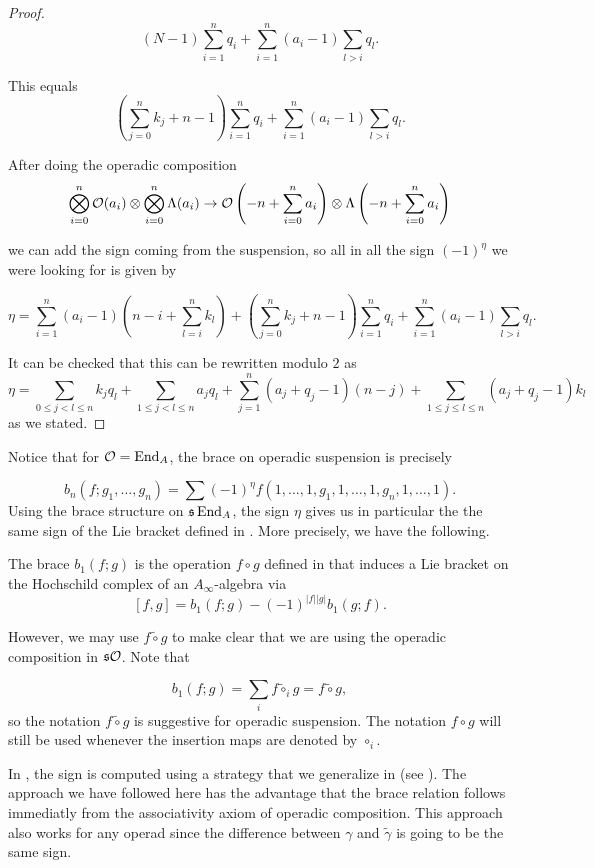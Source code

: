 \documentclass[Thesis.tex]{subfiles}
\begin{document}
\begin{proof}
\[(N-1)\sum_{i=1}^nq_i+\sum_{i=1}^n (a_i-1)\sum_{l>i}q_l.\]

This equals
\[\left(\sum_{j=0}^nk_j +n-1\right)\sum_{i=1}^nq_i+\sum_{i=1}^n (a_i-1)\sum_{l>i}q_l.\]

After doing the operadic composition 
\[\bigotimes_{i=0}^n {\mathcal O}(a_i)\otimes \bigotimes_{i=0}^n \Lambda(a_i)\to {\mathcal O}\left(-n+\sum_{i=0}^na_i\right)\otimes \Lambda\left(-n+\sum_{i=0}^na_i\right)\]

we can add the sign coming from the suspension, so all in all the sign $(-1)^\eta$ we were looking for is given by

\[\eta=\sum_{i=1}^n(a_i-1)(n-i+\sum_{l=i}^nk_l)+(\sum_{j=0}^nk_j +n-1)\sum_{i=1}^nq_i+\sum_{i=1}^n (a_i-1)\sum_{l>i}q_l.\]

It can be checked that this can be rewritten modulo $2$ as 
\[\eta=\sum_{0\leq j<l\leq n}k_jq_l+\sum_{1\leq j<l\leq n}a_jq_l+\sum_{j=1}^n (a_j+q_j-1)(n-j)+\sum_{1\leq j\leq l\leq n} (a_j+q_j-1)k_l\]
as we stated.
\end{proof}

 Notice that for ${\mathcal O}=\operatorname{End}_A$, the brace on operadic suspension is precisely
 
 \[b_n(f;g_1,\dots,g_n)=\sum (-1)^\eta f(1,\dots,1,g_1,1,\dots,1,g_n,1,\dots,1).\]
Using the brace structure on $\mathfrak{s}\operatorname{End}_A$, the sign $\eta$ gives us in particular the the same sign of the Lie bracket defined in \cite{RW}. More precisely, we have the following.

\begin{corollary} The brace $b_1(f;g)$ is the operation $f\circ g$ defined in \cite{RW} that induces a Lie bracket on the Hochschild complex of an $A_\infty$-algebra via
\[
[f,g]=b_1(f;g)-(-1)^{|f||g|}b_1(g;f).
\]
\end{corollary} 
However, we may use $f\tilde{\circ}g$ to make clear that we are using the operadic composition in $\mathfrak{s}{\mathcal O}$. Note that

\[
b_1(f;g)=\sum_i f\tilde{\circ}_i g=f\tilde{\circ}g,
\]
so the notation $f\tilde{\circ} g$ is suggestive for operadic suspension. The notation $f\circ g$ will still be used whenever the insertion maps are denoted by $\circ_i$.

In \cite{RW}, the sign is computed using a strategy that we generalize in  (see ). The approach we have followed here has the advantage that the brace relation follows immediatly from the associativity axiom of operadic composition. This approach also works for any operad since the difference between $\gamma$ and $\tilde{\gamma}$ is going to be the same sign. 
\end{document}
